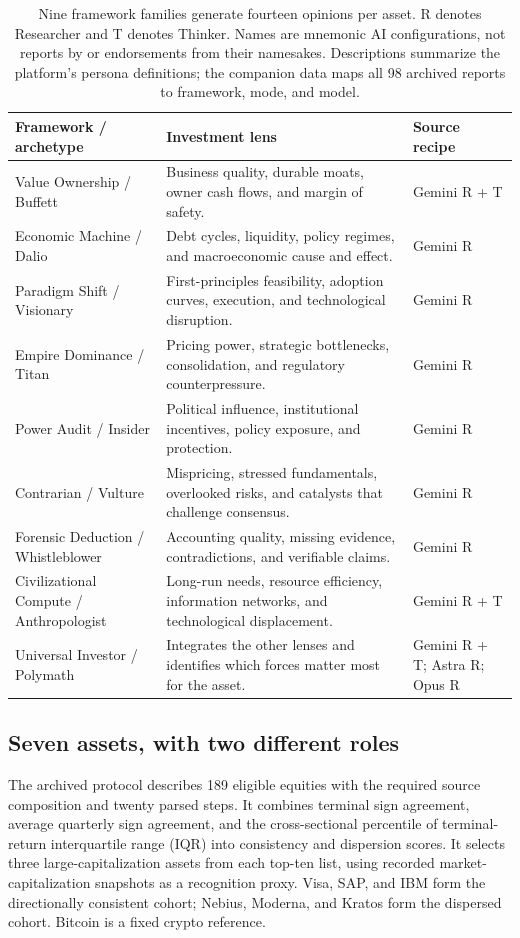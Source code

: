 \documentclass[11pt]{article}
\begin{document}
\begin{table}[H]
\centering\small
\begin{tabularx}{\linewidth}{@{}>{\raggedright\arraybackslash}p{.27\linewidth}>{\raggedright\arraybackslash}X >{\raggedright\arraybackslash}p{.17\linewidth}@{}}
\toprule
Framework / archetype & Investment lens & Source recipe \\
\midrule
Value Ownership / Buffett & Business quality, durable moats, owner cash flows, and margin of safety. & Gemini R + T \\
Economic Machine / Dalio & Debt cycles, liquidity, policy regimes, and macroeconomic cause and effect. & Gemini R \\
Paradigm Shift / Visionary & First-principles feasibility, adoption curves, execution, and technological disruption. & Gemini R \\
Empire Dominance / Titan & Pricing power, strategic bottlenecks, consolidation, and regulatory counterpressure. & Gemini R \\
Power Audit / Insider & Political influence, institutional incentives, policy exposure, and protection. & Gemini R \\
Contrarian / Vulture & Mispricing, stressed fundamentals, overlooked risks, and catalysts that challenge consensus. & Gemini R \\
Forensic Deduction / Whistleblower & Accounting quality, missing evidence, contradictions, and verifiable claims. & Gemini R \\
Civilizational Compute / Anthropologist & Long-run needs, resource efficiency, information networks, and technological displacement. & Gemini R + T \\
Universal Investor / Polymath & Integrates the other lenses and identifies which forces matter most for the asset. & Gemini R + T; Astra R; Opus R \\
\bottomrule
\end{tabularx}
\caption{Nine framework families generate fourteen opinions per asset. R denotes Researcher and T denotes Thinker. Names are mnemonic AI configurations, not reports by or endorsements from their namesakes. Descriptions summarize the platform's persona definitions; the companion data maps all 98 archived reports to framework, mode, and model.}
\label{tab:frameworks}
\end{table}

\subsection{Seven assets, with two different roles}
The archived protocol describes 189 eligible equities with the required source composition and twenty parsed steps. It combines terminal sign agreement, average quarterly sign agreement, and the cross-sectional percentile of terminal-return interquartile range (IQR) into consistency and dispersion scores. It selects three large-capitalization assets from each top-ten list, using recorded market-capitalization snapshots as a recognition proxy. Visa, SAP, and IBM form the directionally consistent cohort; Nebius, Moderna, and Kratos form the dispersed cohort. Bitcoin is a fixed crypto reference.
\end{document}
